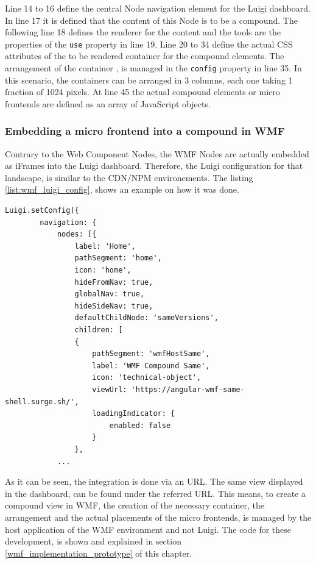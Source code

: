 Line 14 to 16 define the central Node navigation element for the Luigi dashboard. In line 17 it is defined that the content of this Node is to be a compound. The following line 18 defines the renderer for the content and the tools are the properties of the \texttt{use} property in line 19. Line 20 to 34 define the actual CSS attributes of the to be rendered container for the compound elements. The arrangement of the container , is managed in the \texttt{config} property in line 35. In this scenario, the containers can be arranged in 3 columns, each one taking 1 fraction of 1024 pixels.
At line 45 the actual compound elements or micro frontends are defined as an array of JavaScript objects.

\subsubsection{Embedding a micro frontend into a compound in WMF}

Contrary to the Web Component Nodes, the WMF Nodes are actually embedded as iFrames into the Luigi dashboard. Therefore, the Luigi configuration for that landscape, is similar to the CDN/NPM environements. The listing \ref{list:wmf_luigi_config}, shows an example on how it was done.

\begin{lstlisting}[caption=Example configuration to embed a WMF micro frontend compound as a Node in Luigi, label=list:wmf_luigi_config,  xleftmargin=.0\textwidth, xrightmargin=.0\textwidth]
	Luigi.setConfig({
		navigation: {
			nodes: [{
				label: 'Home',
				pathSegment: 'home',
				icon: 'home',
				hideFromNav: true,
				globalNav: true,
				hideSideNav: true,
				defaultChildNode: 'sameVersions',
				children: [
                {
					pathSegment: 'wmfHostSame',
					label: 'WMF Compound Same',
					icon: 'technical-object',
					viewUrl: 'https://angular-wmf-same-shell.surge.sh/',
					loadingIndicator: {
						enabled: false
					}
				},
			...
\end{lstlisting}

As it can be seen, the integration is done via an URL. The same view displayed in the dashboard, can be found under the referred URL. This means, to create a compound view in WMF, the creation of the necessary container, the arrangement and the actual placements of the micro frontends, is managed by the host application of the WMF environment and not Luigi.
The code for these development, is shown and explained in section \ref{wmf_implementation_prototype} of this chapter.

